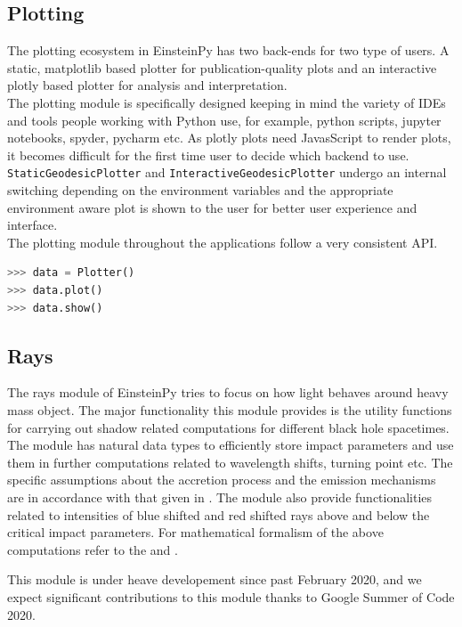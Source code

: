 \documentclass[refree]{aa}
\begin{document}
\subsection{Plotting}
The plotting ecosystem in EinsteinPy has two back-ends for two type of users. A static, matplotlib based plotter for publication-quality plots and an interactive plotly based plotter for analysis and interpretation. \\
The plotting module is specifically designed keeping in mind the variety of IDEs and tools people working with Python use, for example, python scripts, jupyter notebooks, spyder, pycharm etc. As plotly plots need JavasScript to render plots, it becomes difficult for the first time user to decide which backend to use. \texttt{StaticGeodesicPlotter} and \texttt{InteractiveGeodesicPlotter} undergo an internal switching depending on the environment variables and the appropriate environment aware plot is shown to the user for better user experience and interface.\\
The plotting module throughout the applications follow a very consistent API. \begin{lstlisting}[language=Python, caption=Plotting Module API]
>>> data = Plotter()
>>> data.plot()
>>> data.show()
\end{lstlisting}

\subsection{Rays}
The rays module of EinsteinPy tries to focus on how light behaves around heavy mass object.
The major functionality this module provides is the utility functions for carrying out shadow related computations for different black hole spacetimes. The module has natural data types to efficiently store impact parameters and use them in further computations related to wavelength shifts, turning point etc. The specific assumptions about the accretion process and the emission mechanisms are in accordance with that given in \citep{Bambi_2013}.
The module also provide functionalities related to intensities of blue shifted and red shifted rays above and below the critical impact parameters. For mathematical formalism of the above computations refer to the \citep{Bambi_2013} and \citep{Shaikh_2018}.

This module is under heave developement since past February 2020, and we expect significant contributions to this module thanks to Google Summer of Code 2020.
\end{document}
